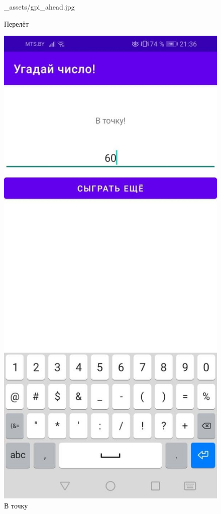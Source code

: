 \documentclass[12pt, a4paper, simple]{eskdtext}
\begin{document}
\begin{figure}[!h]
\begin{minipage}{0.24\textwidth}
                {_assets/gpi_ahead.jpg}
            \caption{Перелёт}
            \label{fig:gpi_ahead}
        \end{minipage}
        \begin{minipage}{0.24\textwidth}
            \centering
            \includegraphics[width=\linewidth]
                {_assets/gpi_hit.jpg}
            \caption{В точку}
            \label{fig:gpi_hit}
        \end{minipage}
    \end{figure}
\end{document}
